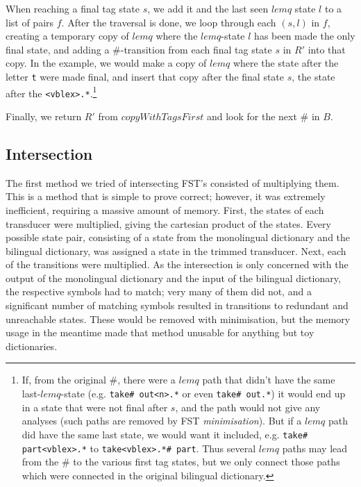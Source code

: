 \documentclass[10pt, a4paper]{article}
\newcommand{\ana}[1]{\texttt{#1}}
\begin{document}
When reaching a final tag state $s$, we add it and the last seen
$lemq$ state $l$ to a list of pairs $f$. After the traversal is done,
we loop through each $(s,l)$ in $f$, creating a temporary copy of
$lemq$ where the $lemq$-state $l$ has been made the only final state,
and adding a \#-transition from each final tag state $s$ in $R'$ into
that copy. In the example, we would make a copy of $lemq$ where the
state after the letter \ana{t} were made final, and insert that copy
after the final state $s$, the state after the
\ana{<vblex>.*}.\footnote{If, from the original \#, there were a
  $lemq$ path that didn't have the same last-$lemq$-state (e.g.
  \ana{take\# out<n>.*} or even \ana{take\# out.*}) it would end up in
  a state that were not final after $s$, and the path would not give
  any analyses (such paths are removed by FST \emph{minimisation}).
  But if a $lemq$ path did have the same last state, we would want it
  included, e.g. \ana{take\# part<vblex>.*} to \ana{take<vblex>.*\#
    part}. Thus several $lemq$ paths may lead from the \# to the
  various first tag states, but we only connect those paths which were
  connected in the original bilingual dictionary.}

Finally, we return $R'$ from $copyWithTagsFirst$ and look for the next
\# in $B$.

\subsection{Intersection}


The first method we tried of intersecting FST's consisted of
multiplying them. This is a method that is simple to prove correct;
however, it was extremely inefficient, requiring a massive amount of
memory. First, the states of each transducer were multiplied, giving
the cartesian product of the states. Every possible state pair,
consisting of a state from the monolingual dictionary and the
bilingual dictionary, was assigned a state in the trimmed transducer.
Next, each of the transitions were multiplied. As the intersection is
only concerned with the output of the monolingual dictionary and the
input of the bilingual dictionary, the respective symbols had to
match; very many of them did not, and a significant number of matching
symbols resulted in transitions to redundant and unreachable states.
These would be removed with minimisation, but the memory usage in the
meantime made that method unusable for anything but toy dictionaries.
\end{document}
